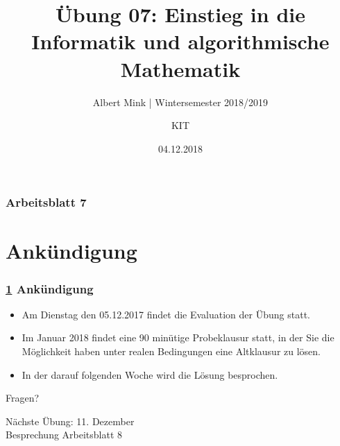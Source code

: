 \documentclass[c,18pt]{beamer}
\date{04.12.2018}
\title[Übung 07: Einstieg in die Informatik und algorithmische Mathematik]
  {Übung 07: Einstieg in die Informatik und algorithmische Mathematik}
\subtitle{Albert Mink | Wintersemester 2018/2019}
\author[Albert Mink, ]{KIT}
\institute[Institut für Angewandte und Numerische Mathematik (IANM)]{Institut für Angewandte und Numerische Mathematik}
\begin{document}
\begin{frame}
  \maketitle
\end{frame}

\begin{frame}
  \frametitle{Arbeitsblatt 7}%
\tableofcontents
\end{frame}

\def\kap{0}
\section{Ank\"undigung}\label{K:ank}
\begin{frame}
  \frametitle{\ref{K:ank} Ank\"undigung}%

\begin{itemize}
\item Am Dienstag den 05.12.2017 findet die Evaluation der \"Ubung statt.
\item Im Januar 2018 findet eine 90 min\"utige Probeklausur statt, in der Sie die M\"oglichkeit haben unter realen Bedingungen eine Altklausur zu l\"osen.
\item In der darauf folgenden Woche wird die L\"osung besprochen.
\end{itemize}

\end{frame}


\def\kap{2}
\setcounter{exercise}{27}
\setcounter{exercise}{28}
\setcounter{exercise}{29}
\setcounter{exercise}{30}


\begin{frame}
\centering
\Huge\textcolor{KITgreen}{Fragen?}
\vspace{2cm}

{\LARGE
N\"achste \"Ubung: 11. Dezember\\
Besprechung Arbeitsblatt 8
}
\end{frame}


\end{document}
